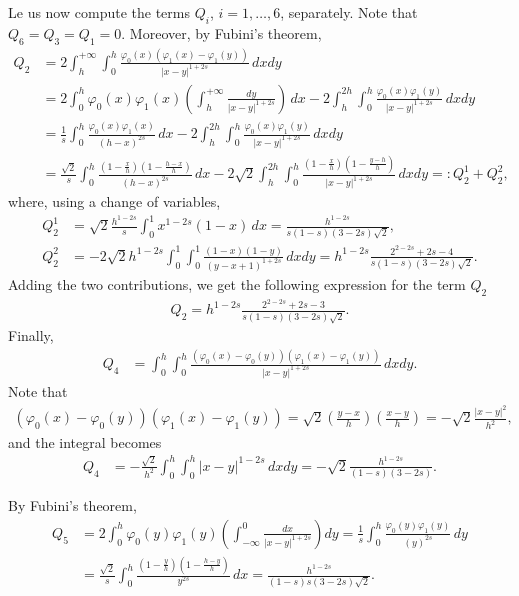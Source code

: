 \documentclass[10 pt]{article}
\numberwithin{equation}{section}
\begin{document}
Le us now compute the terms $Q_i$, $i=1,\ldots,6$, separately.   Note that $Q_6=Q_3=Q_1 = 0.$ Moreover, by Fubini's theorem,
\begin{align*}
	Q_2 &= 2\int_{h}^{+\infty}\int_{0}^{h} \frac{\varphi_0(x)(\varphi_{1}(x)-\varphi_{1}(y))}{|x-y|^{1+2s}}\,dxdy\\
	&= 2\int_{0}^{h}\varphi_0(x)\varphi_{1}(x)\left(\int_{h}^{+\infty} \frac{dy}{|x-y|^{1+2s}}\right)\,dx - 2\int_{h}^{2h}\int_{0}^{h} \frac{\varphi_0(x)\varphi_{1}(y)}{|x-y|^{1+2s}}\,dxdy 
	\\
	&= \frac{1}{s}\int_{0}^{h}\frac{\varphi_0(x)\varphi_{1}(x)}{(h-x)^{2s}}\,dx - 2\int_{h}^{2h}\int_{0}^{h} \frac{\varphi_0(x)\varphi_{1}(y)}{|x-y|^{1+2s}}\,dxdy
	\\
	&= \frac{\sqrt{2}}{s}\int_{0}^{h}\frac{\left(1-\frac{x}{h}\right)\left(1-\frac{h-x}{h}\right)}{(h-x)^{2s}}\,dx - 2\sqrt{2}\int_{h}^{2h}\int_{0}^{h} \frac{\left(1-\frac{x}{h}\right)\left(1-\frac{y-h}{h}\right)}{|x-y|^{1+2s}}\,dxdy=:Q_2^1+Q_2^2,
\end{align*}
where, using a change of variables,
\begin{align*}
Q_2^1&=\sqrt{2}\frac{h^{1-2s}}{s}\int_0^1 x^{1-2s}(1-x)\,dx = \frac{h^{1-2s}}{s(1-s)(3-2s)\sqrt{2}},\\
Q_2^2 &= -2\sqrt{2}h^{1-2s}\int_0^1\int_0^1\frac{(1-x)(1-y)}{(y-x+1)^{1+2s}}\,dxdy = h^{1-2s}\frac{2^{2-2s}+2s-4}{s(1-s)(3-2s)\sqrt{2}}.
\end{align*}
Adding the two contributions, we get the following expression for the term $Q_2$
\begin{align*}
	Q_2 = h^{1-2s}\frac{2^{2-2s}+2s-3}{s(1-s)(3-2s)\sqrt{2}}.
\end{align*}
Finally, 
\begin{align*}
	Q_4 &= \int_{0}^{h}\int_{0}^{h} \frac{(\varphi_0(x)-\varphi_0(y))(\varphi_{1}(x)-\varphi_{1}(y))}{|x-y|^{1+2s}}\,dxdy. 
\end{align*}
Note that
\begin{align*}
	(\varphi_0(x)-\varphi_0(y))(\varphi_{1}(x)-\varphi_{1}(y)) = \sqrt{2}\left(\frac{y-x}{h}\right)\left(\frac{x-y}{h}\right) = -\sqrt{2}\frac{|x-y|^2}{h^2},
\end{align*}
and the integral becomes
\begin{align*}
	Q_4 &= -\frac{\sqrt{2}}{h^2}\int_{0}^{h}\int_{0}^{h} |x-y|^{1-2s}\,dxdy = -\sqrt{2}\frac{h^{1-2s}}{(1-s)(3-2s)}.
\end{align*}

By Fubini's theorem,
\begin{align*}
	Q_5 &= 2\int_{0}^{h}\varphi_0(y)\varphi_{1}(y)\left(\int_{-\infty}^{0} \frac{dx}{|x-y|^{1+2s}}\right)dy = \frac{1}{s}\int_{0}^{h}\frac{\varphi_0(y)\varphi_{1}(y)}{(y)^{2s}}\,dy \\
	&= \frac{\sqrt{2}}{s}\int_{0}^{h}\frac{\left(1-\frac{y}{h}\right)\left(1-\frac{h-y}{h}\right)}{y^{2s}}\,dx=\frac{h^{1-2 s}}{(1-s) s (3-2 s)\sqrt{2}}.
\end{align*}
\end{document}

